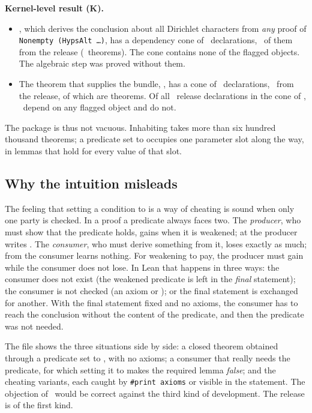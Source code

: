 \begin{verdictbox}
\textbf{Kernel-level result (K).}
\begin{itemize}
\item {}, which derives the conclusion about all Dirichlet characters from \emph{any} proof of \texttt{Nonempty (HypsAlt …)}, has a dependency cone of \NgreenAll\ declarations,
\NgreenProj\ of them from the release (\NgreenThm\ theorems). The cone contains none of the flagged objects. The algebraic step was proved without them.
\item The theorem that supplies the bundle, , has a cone of \NpackageAll\ declarations, \NpackageProj\ from the release, of which \textbf{\NpackageThm} are theorems.
Of all \NconeProj\ release declarations in the cone of , \Nflagged\ depend on any flagged object and \textbf{\NfreeProj} do not.
\end{itemize}
\end{verdictbox}

The package is thus not vacuous. Inhabiting  takes more than six hundred thousand theorems; a predicate set to  occupies one parameter slot along the way, in lemmas that hold for every value of that slot.

\subsection{Why the intuition misleads}
\label{sec:asym}

The feeling that setting a condition to  is a way of cheating is sound when only one party is checked. In a proof a predicate always faces two.
The \emph{producer}, who must show that the predicate holds, gains when it is weakened; at  the producer writes .
The \emph{consumer}, who must derive something from it, loses exactly as much; from  the consumer learns nothing.
For weakening to pay, the producer must gain while the consumer does not lose. In Lean that happens in three ways: the consumer does not exist (the weakened predicate is left in the \emph{final} statement);
the consumer is not checked (an axiom or ); or the final statement is exchanged for another. With the final statement fixed and no axioms, the consumer has to reach the conclusion without the content of the predicate, and then the predicate was not needed.

The file  shows the three situations side by side: a closed theorem obtained through a predicate set to , with no axioms;
a consumer that really needs the predicate, for which setting it to  makes the required lemma \emph{false}; and the cheating variants, each caught by \texttt{\#print axioms} or visible in the statement.
The objection of \N\ would be correct against the third kind of development. The release is of the first kind.
